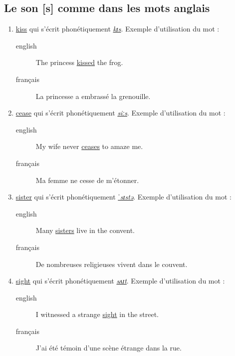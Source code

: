 \subsection{Le son [s] comme dans les mots anglais}
\label{sec:org08b2b88}
\begin{enumerate}
\item \href{http://www.wordreference.com/enfr/kiss}{kiss} qui s'écrit phonétiquement \href{https://en.oxforddictionaries.com/definition/kiss}{\emph{kɪs}}. Exemple d'utilisation du mot :
\begin{description}
\item[{english}] \textenglish{The princess \href{https://youtu.be/vMbVzr7WqIo}{kissed} the frog.}
\item[{français}] La princesse a embrassé la grenouille.
\end{description}
\item \href{http://www.wordreference.com/enfr/cease}{cease} qui s'écrit phonétiquement \href{https://en.oxforddictionaries.com/definition/cease}{\emph{siːs}}. Exemple d'utilisation du mot :
\begin{description}
\item[{english}] \textenglish{My wife never \href{https://youtu.be/6m9bEMejTKI}{ceases} to amaze me.}
\item[{français}] Ma femme ne cesse de m'étonner.
\end{description}
\item \href{http://www.wordreference.com/enfr/sister}{sister} qui s'écrit phonétiquement \href{https://en.oxforddictionaries.com/definition/sister}{\emph{ˈsɪstə}}. Exemple d'utilisation du mot :
\begin{description}
\item[{english}] \textenglish{Many \href{https://youtu.be/SBNB13EeRx4}{sisters} live in the convent.}
\item[{français}] De nombreuses religieuses vivent dans le couvent.
\end{description}
\item \href{http://www.wordreference.com/enfr/sight}{sight} qui s'écrit phonétiquement \href{https://en.oxforddictionaries.com/definition/sight}{\emph{sʌɪt}}. Exemple d'utilisation du mot : 
\begin{description}
\item[{english}] \textenglish{I witnessed a strange \href{https://youtu.be/JeiVf30VDDU}{sight} in the street.}
\item[{français}] J'ai été témoin d'une scène étrange dans la rue.
\end{description}
\end{enumerate}
